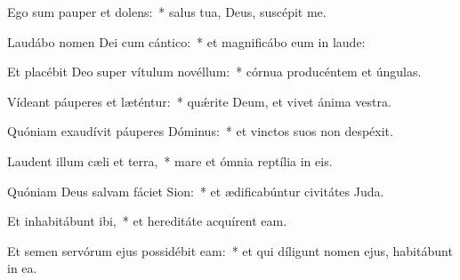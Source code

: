 
\item Ego sum pauper et dolens:~* salus tua, Deus, suscépit me.

\item Laudábo nomen Dei cum cántico:~* et magnificábo eum in laude:

\item Et placébit Deo super vítulum novéllum:~* córnua producéntem et úngulas.

\item Vídeant páuperes et læténtur:~* quǽrite Deum, et vivet ánima vestra.

\item Quóniam exaudívit páuperes Dóminus:~* et vinctos suos non despéxit.

\item Laudent illum cæli et terra,~* mare et ómnia reptília in eis.

\item Quóniam Deus salvam fáciet Sion:~* et ædificabúntur civitátes Juda.

\item Et inhabitábunt ibi,~* et hereditáte acquírent eam.

\item Et semen servórum ejus possidébit eam:~* et qui díligunt nomen ejus, habitábunt in ea.
